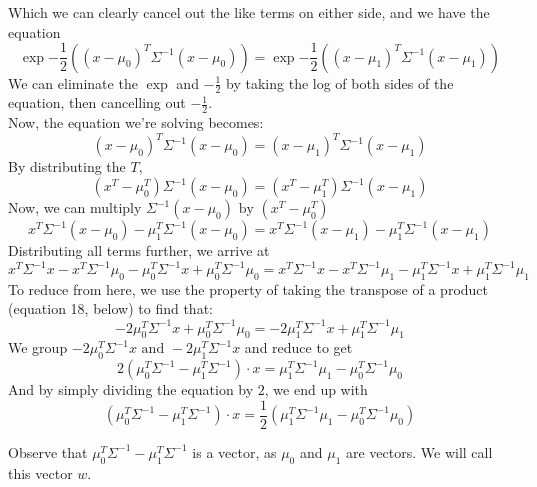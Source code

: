 \documentclass[11pt]{article}
\begin{document}
Which we can clearly cancel out the like terms on either side, and we have the equation
\begin{equation}
\exp{-\frac{1}{2}((x - \mu_0)^T\Sigma^{-1}(x-\mu_0))} = \exp{-\frac{1}{2}((x - \mu_1)^T\Sigma^{-1}(x-\mu_1))}
\end{equation}
We can eliminate the $\exp$ and $-\frac{1}{2}$ by taking the log of both sides of the equation, then cancelling out $-\frac{1}{2}$.\\
Now, the equation we're solving becomes:
\begin{equation}
(x-\mu_0)^T\Sigma^{-1}(x-\mu_0) = (x-\mu_1)^T\Sigma^{-1}(x-\mu_1)
\end{equation}
By distributing the $T$, 
\begin{equation}
(x^T-\mu^T_0)\Sigma^{-1}(x-\mu_0) = (x^T-\mu^T_1)\Sigma^{-1}(x-\mu_1)
\end{equation}
Now, we can multiply $\Sigma^{-1}(x-\mu_0) \text{ by } (x^T-\mu^T_0)$
\begin{equation}
x^T\Sigma^{-1}(x-\mu_0)-\mu^T_1\Sigma^{-1}(x-\mu_0) = x^T\Sigma^{-1}(x-\mu_1)-\mu^T_1\Sigma^{-1}(x-\mu_1)
\end{equation}
Distributing all terms further, we arrive at
\begin{equation}
x^T\Sigma^{-1}x -x^T\Sigma^{-1}\mu_0 - \mu^T_0\Sigma^{-1}x + \mu^T_0\Sigma^{-1}\mu_0 = x^T\Sigma^{-1}x -x^T\Sigma^{-1}\mu_1 - \mu^T_1\Sigma^{-1}x + \mu^T_1\Sigma^{-1}\mu_1
\end{equation}
To reduce from here, we use the property of taking the transpose of a product (equation 18, below) to find that:
\begin{equation}
-2\mu^T_0\Sigma^{-1}x + \mu^T_0\Sigma^{-1}\mu_0 = -2\mu^T_1\Sigma^{-1}x + \mu^T_1\Sigma^{-1}\mu_1
\end{equation}
We group $-2\mu^T_0\Sigma^{-1}x \text{ and } -2\mu^T_1\Sigma^{-1}x$ and reduce to get
\begin{equation}
2(\mu^T_0\Sigma^{-1} - \mu^T_1\Sigma^{-1}) \cdot x = \mu^T_1\Sigma^{-1}\mu_1 - \mu^T_0\Sigma^{-1}\mu_0
\end{equation}
And by simply dividing the equation by $2$, we end up with
\begin{equation}
(\mu^T_0\Sigma^{-1} - \mu^T_1\Sigma^{-1}) \cdot x = \frac{1}{2}(\mu^T_1\Sigma^{-1}\mu_1 - \mu^T_0\Sigma^{-1}\mu_0)
\end{equation}


\noindent Observe that $\mu^T_0\Sigma^{-1} - \mu^T_1\Sigma^{-1}$ is a vector, as $\mu_0$ and $\mu_1$ are vectors. We will call this vector $w$.\\
\end{document}
